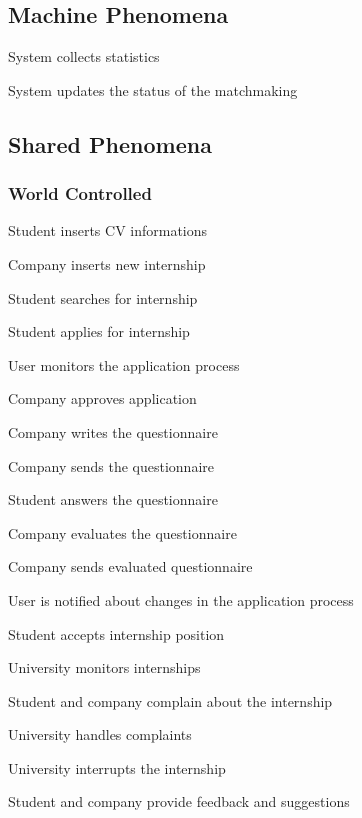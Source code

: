 \subsection{Machine Phenomena}
\begin{enumerate}[label={\textbf{[MP\arabic*]}}, leftmargin=1.52cm]
    \item System collects statistics 
    \item System updates the status of the matchmaking
\end{enumerate}

\subsection{Shared Phenomena}
\subsubsection*{World Controlled}
\begin{enumerate}[label={\textbf{[SP\arabic*]}}, leftmargin=1.52cm]
    \item Student inserts CV informations 
    \item Company inserts new internship 
    \item Student searches for internship 
    \item Student applies for internship 
    \item User monitors the application process 
    \item Company approves application 
    \item Company writes the questionnaire 
    \item Company sends the questionnaire 
    \item Student answers the questionnaire 
    \item Company evaluates the questionnaire 
    \item Company sends evaluated questionnaire 
    \item User is notified about changes in the application process
    \item Student accepts internship position 
    \item University monitors internships 
    \item Student and company complain about the internship
    \item University handles complaints 
    \item University interrupts the internship 
    \item Student and company provide feedback and suggestions
\end{enumerate}
